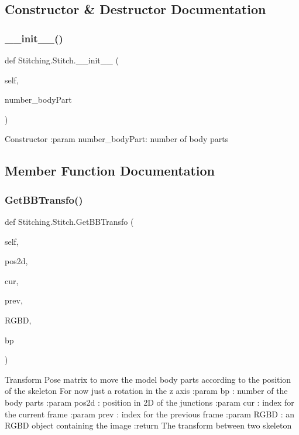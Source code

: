 \subsection{Constructor \& Destructor Documentation}
\mbox{\label{class_stitching_1_1_stitch_ab891a54caf4e40cd3a6eacdfae3d08f2}} 
\subsubsection{\+\_\+\+\_\+init\+\_\+\+\_\+()}
{\footnotesize\ttfamily def Stitching.\+Stitch.\+\_\+\+\_\+init\+\_\+\+\_\+ (\begin{DoxyParamCaption}\item[{}]{self,  }\item[{}]{number\+\_\+body\+Part }\end{DoxyParamCaption})}

\begin{DoxyVerb}Constructor
:param number_bodyPart: number of body parts
\end{DoxyVerb}
 

\subsection{Member Function Documentation}
\mbox{\label{class_stitching_1_1_stitch_a24d4c32a258141cbdc3cfa3bae127fe7}} 
\subsubsection{Get\+B\+B\+Transfo()}
{\footnotesize\ttfamily def Stitching.\+Stitch.\+Get\+B\+B\+Transfo (\begin{DoxyParamCaption}\item[{}]{self,  }\item[{}]{pos2d,  }\item[{}]{cur,  }\item[{}]{prev,  }\item[{}]{R\+G\+BD,  }\item[{}]{bp }\end{DoxyParamCaption})}

\begin{DoxyVerb}Transform Pose matrix to move the model body parts according to the position of the skeleton
For now just a rotation in the z axis
:param bp : number of the body parts
:param pos2d : position in 2D of the junctions
:param cur : index for the current frame
:param prev : index for the previous frame
:param RGBD : an RGBD object containing the image
:return The transform between two skeleton
\end{DoxyVerb}
 \mbox{\label{class_stitching_1_1_stitch_ae2a91306c029bcd2b6631a64d662cbff}} 
